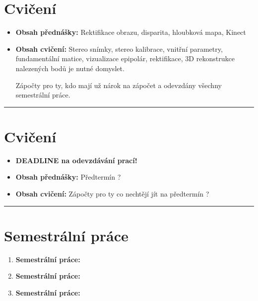 \documentclass[12pt, a4paper]{article}
\begin{document}
\newpage





\section{Cvičení}
\begin{itemize}
	\item \par{\textbf{Obsah přednášky:} Rektifikace obrazu, disparita, hloubková mapa, Kinect}
	\item \par{\textbf{Obsah cvičení:} Stereo snímky, stereo kalibrace, vnitřní parametry, fundamentální matice, vizualizace epipolár, rektifikace, {\color{red}3D rekonstrukce nalezených bodů je nutné domyslet.}}
	\par{{\color{blue} Zápočty pro ty, kdo mají už nárok na zápočet a odevzdány všechny semestrální práce.}}
\end{itemize}
\noindent\rule[0.5ex]{\linewidth}{0.4pt}













\section{Cvičení}
\begin{itemize}
	\item \par{\textbf{DEADLINE na odevzdávání prací!}}
	\item \par{\textbf{Obsah přednášky:} {\color{red}Předtermín ?}}
	\item \par{\textbf{Obsah cvičení:} {\color{blue} Zápočty pro ty co nechtějí jít na předtermín ?}}
\end{itemize}
\noindent\rule[0.5ex]{\linewidth}{0.4pt}














\section*{Semestrální práce}
\begin{enumerate}
	\item \par{\textbf{Semestrální práce:}}
	\item \par{\textbf{Semestrální práce:}}
	\item \par{\textbf{Semestrální práce:}}
\end{enumerate}
\end{document}
